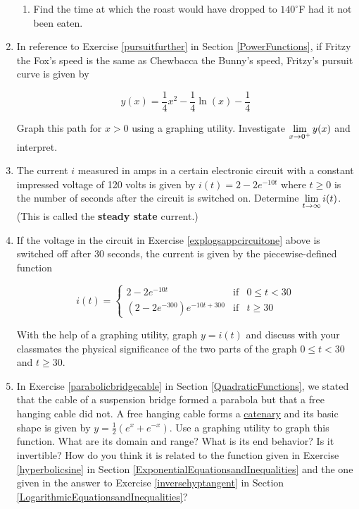 \begin{enumerate}
\begin{enumerate}
\item Find the time at which the roast would have dropped to $140^{\circ}$F had it not been eaten. 

\end{enumerate}

\item  \label{pursuitlog} In reference to Exercise \ref{pursuitfurther} in Section \ref{PowerFunctions}, if Fritzy the Fox's speed is the same as Chewbacca the Bunny's speed, Fritzy's pursuit curve is given by

\[y(x) = \frac{1}{4} x^2-\frac{1}{4} \ln(x)-\frac{1}{4}\]

Graph this path for $x > 0$ using a graphing utility.  Investigate  $\displaystyle{\lim_{x \rightarrow 0^{+}}  y(x)}$ and interpret.

\item \label{explogsappcircuitone} The current $i$ measured in amps in a certain electronic circuit with a constant impressed voltage of 120 volts is given by $i(t) = 2 - 2e^{-10t}$ where $t \geq 0$ is the number of seconds after the circuit is switched on.  Determine  $\displaystyle{\lim_{t \rightarrow \infty} i(t)}$.  (This is called the \textbf{steady state} current.)


\item If the voltage in the circuit in Exercise \ref{explogsappcircuitone} above is switched off after 30 seconds, the current is given by the piecewise-defined function 

\[i(t) = \left\{ \begin{array}{rcl} 2 - 2e^{-10t} & \mbox{if} & 0 \leq t < 30 \\ [6pt]
\left(2 - 2e^{-300}\right) e^{-10t+300} & \mbox{if} & t \geq 30 \end{array} \right.\]  

With the help of a graphing utility, graph $y = i(t)$ and discuss with your classmates the physical significance of the two parts of the graph $0 \leq t < 30$ and $t \geq 30$.


\item \label{catenary} In Exercise \ref{parabolicbridgecable} in Section \ref{QuadraticFunctions}, we stated that the cable of a suspension bridge formed a parabola but that a free hanging cable did not.  A free hanging cable forms a \underline{catenary} and its basic shape is given by $y = \frac{1}{2}\left(e^{x} + e^{-x}\right)$.  Use a graphing utility to graph this function.  What are its domain and range?  What is its end behavior?  Is it invertible?  How do you think it is related to the function given in Exercise \ref{hyperbolicsine} in Section \ref{ExponentialEquationsandInequalities} and the one given in the answer to Exercise \ref{inversehyptangent} in Section \ref{LogarithmicEquationsandInequalities}?  


\end{enumerate}
